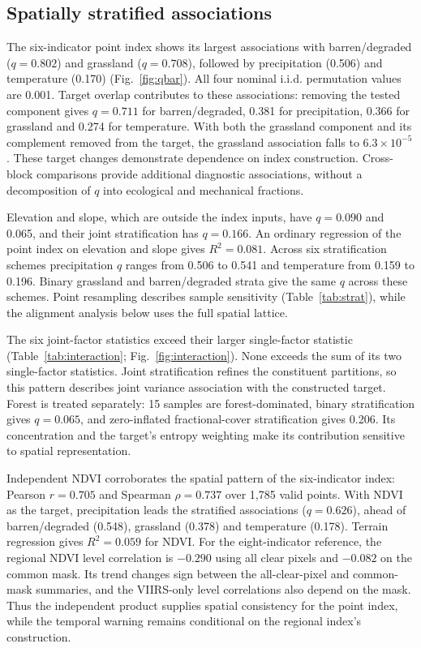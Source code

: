 \documentclass[preprint,11pt,authoryear]{elsarticle}
\begin{document}
\subsection{Spatially stratified associations}
\label{sec:spatial}
The six-indicator point index shows its largest associations with barren/degraded ($q=0.802$) and grassland ($q=0.708$), followed by precipitation (0.506) and temperature (0.170) (Fig.~\ref{fig:qbar}). All four nominal i.i.d. permutation values are 0.001. Target overlap contributes to these associations: removing the tested component gives $q=0.711$ for barren/degraded, 0.381 for precipitation, 0.366 for grassland and 0.274 for temperature. With both the grassland component and its complement removed from the target, the grassland association falls to $6.3\times10^{-5}$. These target changes demonstrate dependence on index construction. Cross-block comparisons provide additional diagnostic associations, without a decomposition of $q$ into ecological and mechanical fractions.

Elevation and slope, which are outside the index inputs, have $q=0.090$ and 0.065, and their joint stratification has $q=0.166$. An ordinary regression of the point index on elevation and slope gives $R^2=0.081$. Across six stratification schemes precipitation $q$ ranges from 0.506 to 0.541 and temperature from 0.159 to 0.196. Binary grassland and barren/degraded strata give the same $q$ across these schemes. Point resampling describes sample sensitivity (Table~\ref{tab:strat}), while the alignment analysis below uses the full spatial lattice.

The six joint-factor statistics exceed their larger single-factor statistic (Table~\ref{tab:interaction}; Fig.~\ref{fig:interaction}). None exceeds the sum of its two single-factor statistics. Joint stratification refines the constituent partitions, so this pattern describes joint variance association with the constructed target. Forest is treated separately: 15 samples are forest-dominated, binary stratification gives $q=0.065$, and zero-inflated fractional-cover stratification gives 0.206. Its concentration and the target's entropy weighting make its contribution sensitive to spatial representation.

Independent NDVI corroborates the spatial pattern of the six-indicator index: Pearson $r=0.705$ and Spearman $\rho=0.737$ over 1,785 valid points. With NDVI as the target, precipitation leads the stratified associations ($q=0.626$), ahead of barren/degraded (0.548), grassland (0.378) and temperature (0.178). Terrain regression gives $R^2=0.059$ for NDVI. For the eight-indicator reference, the regional NDVI level correlation is $-0.290$ using all clear pixels and $-0.082$ on the common mask. Its trend changes sign between the all-clear-pixel and common-mask summaries, and the VIIRS-only level correlations also depend on the mask. Thus the independent product supplies spatial consistency for the point index, while the temporal warning remains conditional on the regional index's construction.
\end{document}
